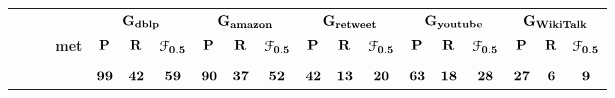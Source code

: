 \documentclass[12pt]{article}
\theoremstyle{thmstyleone}%
\theoremstyle{definition}
\begin{document}
\newpage
\begin{table}[!ht]
\small
\centering
\begin{tabular}{| l | c c c  | c c c | c c c | c c c | c c c | }
   \hline   & \multicolumn{3}{c|}{\bf $\bf G_{dblp}$}   & \multicolumn{3}{c|}{\bf $\bf G_{amazon}$}   & \multicolumn{3}{c|}{\bf $\bf G_{retweet}$}   & \multicolumn{3}{c|}{\bf $\bf G_{youtube}$}   & \multicolumn{3}{c|}{\bf $\bf G_{WikiTalk}$}\\




   \textbf{~~~~~met}     & $\bf P$ & $\bf R$ &  $\bf \EuScript{F}_{0.5}$ & $\bf P$ & $\bf R$ &  $\bf \EuScript{F}_{0.5}$ & $\bf P$ & $\bf R$ &  $\bf \EuScript{F}_{0.5}$ & $\bf P$ & $\bf R$ &  $\bf \EuScript{F}_{0.5}$ & $\bf P$ & $\bf R$ &  $\bf \EuScript{F}_{0.5}$ \\\hline

\multicolumn{1}{c}{}& \multicolumn{15}{c}{} \\ \hline
& $\bf 99$ & $\bf 42$ & $\bf 59$ & $\bf 90$ & $\bf 37$ & $\bf 52$ & $\bf 42$ & $\bf 13$ & $\bf 20$ & $\bf 63$ & $\bf 18$ & $\bf 28$ & $\bf 27$ & $\bf 6$ & $\bf 9$ \\


\end{tabular}
\end{table}
\end{document}
